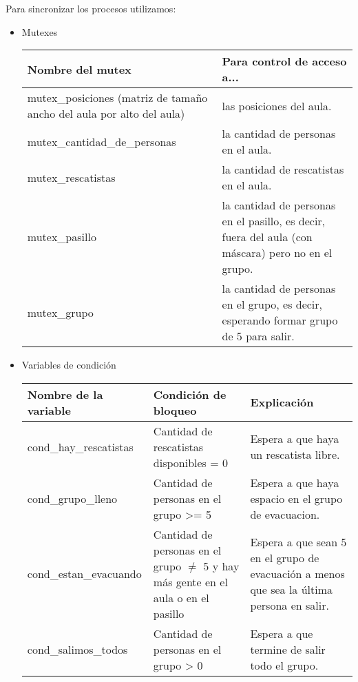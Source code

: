 Para sincronizar los procesos utilizamos:

\begin{itemize}
\item Mutexes
  \medskip

  \begin{tabular}{|p{7.5cm}|p{9cm}|}
  \hline
  Nombre del mutex & Para control de acceso a... \\
  \hline
  mutex\_posiciones (matriz de tamaño ancho del aula por alto del aula) & las posiciones del aula. \\
  \hline
  mutex\_cantidad\_de\_personas & la cantidad de personas en el aula. \\
  \hline
  mutex\_rescatistas & la cantidad de rescatistas en el aula. \\
  \hline
  mutex\_pasillo & la cantidad de personas en el pasillo, es decir, fuera del aula (con máscara) pero no en el grupo. \\
  \hline
  mutex\_grupo & la cantidad de personas en el grupo, es decir, esperando formar grupo de 5 para salir. \\
  \hline
  \end{tabular}

\item Variables de condición
  \medskip

  \begin{tabular}{|l|p{5cm}|p{7cm}|}
  \hline
  Nombre de la variable & Condición de bloqueo & Explicación  \\
  \hline
  cond\_hay\_rescatistas & Cantidad de rescatistas disponibles = 0 & Espera a que haya un rescatista libre. \\ %
  \hline
  cond\_grupo\_lleno & Cantidad de personas en el grupo >= 5 & Espera a que haya espacio en el grupo de evacuacion. \\ %
  \hline
  cond\_estan\_evacuando & Cantidad de personas en el grupo $\neq$ 5 y hay más gente en el aula o en el pasillo & Espera a que sean 5 en el grupo de 
    evacuación a menos que sea la última persona en salir. \\ %
  \hline
  cond\_salimos\_todos & Cantidad de personas en el grupo > 0 & Espera a que termine de salir todo el grupo. \\ %
  \hline
  \end{tabular}

\end{itemize}